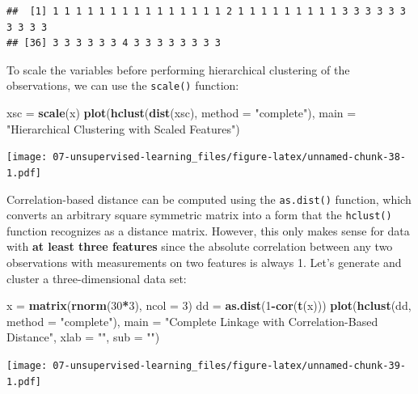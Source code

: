 \documentclass[openany]{book}
\newenvironment{Shaded}{\begin{snugshade}}{\end{snugshade}}
\newcommand{\DataTypeTok}[1]{\textcolor[rgb]{0.13,0.29,0.53}{#1}}
\newcommand{\DecValTok}[1]{\textcolor[rgb]{0.00,0.00,0.81}{#1}}
\newcommand{\KeywordTok}[1]{\textcolor[rgb]{0.13,0.29,0.53}{\textbf{#1}}}
\newcommand{\NormalTok}[1]{#1}
\newcommand{\OperatorTok}[1]{\textcolor[rgb]{0.81,0.36,0.00}{\textbf{#1}}}
\newcommand{\StringTok}[1]{\textcolor[rgb]{0.31,0.60,0.02}{#1}}
\begin{document}
\begin{verbatim}
##  [1] 1 1 1 1 1 1 1 1 1 1 1 1 1 1 1 2 1 1 1 1 1 1 1 1 1 3 3 3 3 3 3 3 3 3 3
## [36] 3 3 3 3 3 3 4 3 3 3 3 3 3 3 3
\end{verbatim}

To scale the variables before performing hierarchical clustering of the
observations, we can use the \texttt{scale()} function:

\begin{Shaded}
\begin{Highlighting}[]
\NormalTok{xsc =}\StringTok{ }\KeywordTok{scale}\NormalTok{(x)}
\KeywordTok{plot}\NormalTok{(}\KeywordTok{hclust}\NormalTok{(}\KeywordTok{dist}\NormalTok{(xsc), }\DataTypeTok{method =} \StringTok{"complete"}\NormalTok{), }\DataTypeTok{main =} \StringTok{"Hierarchical Clustering with Scaled Features"}\NormalTok{)}
\end{Highlighting}
\end{Shaded}

\texttt{[image: 07-unsupervised-learning\_files/figure-latex/unnamed-chunk-38-1.pdf]}

Correlation-based distance can be computed using the \texttt{as.dist()} function, which converts an arbitrary square symmetric matrix into a form that
the \texttt{hclust()} function recognizes as a distance matrix. However, this only
makes sense for data with \textbf{at least three features} since the absolute correlation
between any two observations with measurements on two features is
always 1. Let's generate and cluster a three-dimensional data set:

\begin{Shaded}
\begin{Highlighting}[]
\NormalTok{x =}\StringTok{ }\KeywordTok{matrix}\NormalTok{(}\KeywordTok{rnorm}\NormalTok{(}\DecValTok{30}\OperatorTok{*}\DecValTok{3}\NormalTok{), }\DataTypeTok{ncol =} \DecValTok{3}\NormalTok{)}
\NormalTok{dd =}\StringTok{ }\KeywordTok{as.dist}\NormalTok{(}\DecValTok{1}\OperatorTok{-}\KeywordTok{cor}\NormalTok{(}\KeywordTok{t}\NormalTok{(x)))}
\KeywordTok{plot}\NormalTok{(}\KeywordTok{hclust}\NormalTok{(dd, }\DataTypeTok{method =} \StringTok{"complete"}\NormalTok{), }\DataTypeTok{main =} \StringTok{"Complete Linkage with Correlation-Based Distance"}\NormalTok{, }\DataTypeTok{xlab =} \StringTok{""}\NormalTok{, }\DataTypeTok{sub =} \StringTok{""}\NormalTok{)}
\end{Highlighting}
\end{Shaded}

\texttt{[image: 07-unsupervised-learning\_files/figure-latex/unnamed-chunk-39-1.pdf]}
\end{document}
